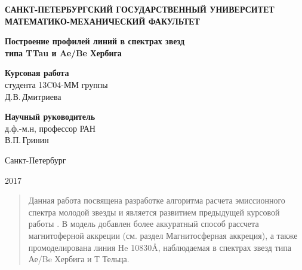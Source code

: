 \documentclass{article}
\begin{document}
\begin{titlepage}
\begin{center}
{\bf САНКТ-ПЕТЕРБУРГСКИЙ ГОСУДАРСТВЕННЫЙ УНИВЕРСИТЕТ\\
МАТЕМАТИКО-МЕХАНИЧЕСКИЙ ФАКУЛЬТЕТ\\}
\end{center}

\vspace{2cm}
 \begin{center}
  \Huge{\bf{Построение профилей линий в спектрах
   звезд\\ типа 
   TTau и Ae/Be Хербига }}
 \end{center}

\vspace{2cm}

\large
 \hspace{8cm}\parbox{8cm}{	

{\bf Курсовая работа}\\
студента 13C04-ММ группы\\
Д.В.\,Дмитриева  
\vspace{1cm}

{\bf Научный руководитель}\\
 д.ф.-м.н, профессор РАН\\ В.П.\,Гринин \\ 
}

\vfill 
\begin{center}
Санкт-Петербург

2017
\end{center}

\end{titlepage}
\newpage
\begin{abstract}
Данная работа посвящена разработке алгоритма расчета эмиссионного спектра молодой звезды и является развитием предыдущей курсовой работы \cite{kurs}. В модель добавлен более аккуратный способ рассчета магнитоферной аккреции (см. раздел Магнитосферная аккреция), а также промоделирована линия He 10830\AA , наблюдаемая в спектрах звезд типа Ае/Be Хербига и Т Тельца.
\end{abstract}
\tableofcontents



\newpage


\end{document}

